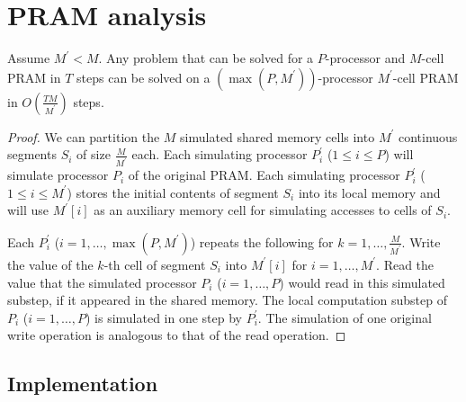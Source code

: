 \section{PRAM analysis}

\begin{lemma}
    Assume $M^\prime < M$. 
    Any problem that can be solved for a $P$-processor and $M$-cell PRAM in $T$ steps can be solved on a $(\max(P, M^\prime))$-processor $M^\prime$-cell PRAM in $O\left(\frac{TM}{M^\prime}\right)$ steps.
\end{lemma}

\begin{proof}
    We can partition the $M$ simulated shared memory cells into $M^\prime$ continuous segments $S_i$ of size $\frac{M}{M^\prime}$ each.
    Each simulating processor $P^\prime_i$ ($1 \leq i \leq P$) will simulate processor $P_i$ of the original PRAM.
    Each simulating processor $P^\prime_i$ ($1 \leq i \leq M^\prime$) stores the initial contents of segment $S_i$ into its local memory and will use $M^\prime[i]$ as an auxiliary memory cell for simulating accesses to cells of $S_i$.
    
    Each $P^\prime_i$ ($i=1, \ldots, \max(P, M^\prime)$) repeats the following for $k = 1, \ldots, \frac{M}{M^\prime}$. 
    Write the value of the $k$-th cell of segment $S_i$ into $M^\prime[i]$ for $i=1, \ldots, M^\prime$.
    Read the value that the simulated processor $P_i$ ($i=1, \ldots, P$) would read in this simulated substep, if it appeared in the shared memory.
    The local computation substep of $P_i$ ($i=1, \ldots, P$) is simulated in one step by $P^\prime_i$.
    The simulation of one original write operation is analogous to that of the read operation.
\end{proof}

\subsection{Implementation}
